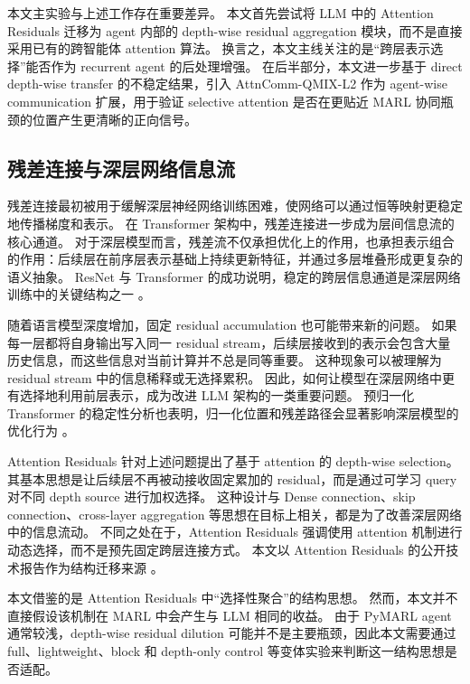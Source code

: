 本文主实验与上述工作存在重要差异。
本文首先尝试将 LLM 中的 Attention Residuals 迁移为 agent 内部的 depth-wise residual aggregation 模块，而不是直接采用已有的跨智能体 attention 算法。
换言之，本文主线关注的是“跨层表示选择”能否作为 recurrent agent 的后处理增强。
在后半部分，本文进一步基于 direct depth-wise transfer 的不稳定结果，引入 AttnComm-QMIX-L2 作为 agent-wise communication 扩展，用于验证 selective attention 是否在更贴近 MARL 协同瓶颈的位置产生更清晰的正向信号。

\subsection{残差连接与深层网络信息流}

残差连接最初被用于缓解深层神经网络训练困难，使网络可以通过恒等映射更稳定地传播梯度和表示。
在 Transformer 架构中，残差连接进一步成为层间信息流的核心通道。
对于深层模型而言，残差流不仅承担优化上的作用，也承担表示组合的作用：后续层在前序层表示基础上持续更新特征，并通过多层堆叠形成更复杂的语义抽象。
ResNet 与 Transformer 的成功说明，稳定的跨层信息通道是深层网络训练中的关键结构之一 \cite{he2016deep,vaswani2017attention}。

随着语言模型深度增加，固定 residual accumulation 也可能带来新的问题。
如果每一层都将自身输出写入同一 residual stream，后续层接收到的表示会包含大量历史信息，而这些信息对当前计算并不总是同等重要。
这种现象可以被理解为 residual stream 中的信息稀释或无选择累积。
因此，如何让模型在深层网络中更有选择地利用前层表示，成为改进 LLM 架构的一类重要问题。
预归一化 Transformer 的稳定性分析也表明，归一化位置和残差路径会显著影响深层模型的优化行为 \cite{xiong2020layernorm}。

Attention Residuals 针对上述问题提出了基于 attention 的 depth-wise selection。
其基本思想是让后续层不再被动接收固定累加的 residual，而是通过可学习 query 对不同 depth source 进行加权选择。
这种设计与 Dense connection、skip connection、cross-layer aggregation 等思想在目标上相关，都是为了改善深层网络中的信息流动。
不同之处在于，Attention Residuals 强调使用 attention 机制进行动态选择，而不是预先固定跨层连接方式。
本文以 Attention Residuals 的公开技术报告作为结构迁移来源 \cite{kimi2026attentionresiduals}。

本文借鉴的是 Attention Residuals 中“选择性聚合”的结构思想。
然而，本文并不直接假设该机制在 MARL 中会产生与 LLM 相同的收益。
由于 PyMARL agent 通常较浅，depth-wise residual dilution 可能并不是主要瓶颈，因此本文需要通过 full、lightweight、block 和 depth-only control 等变体实验来判断这一结构思想是否适配。

